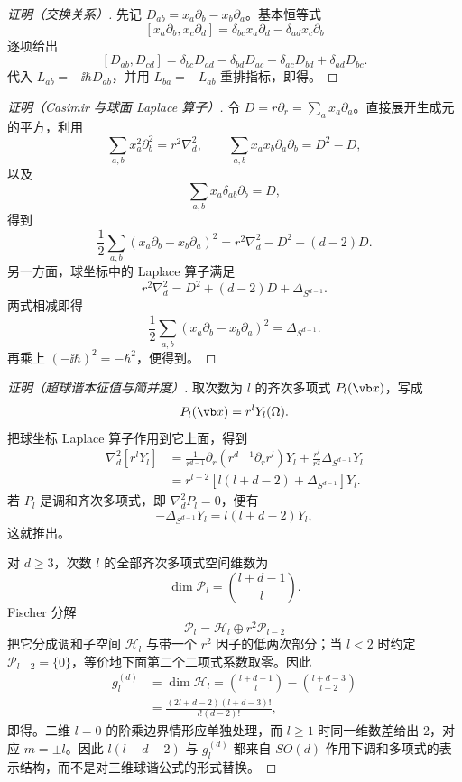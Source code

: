 \begin{proof}[证明（交换关系）]
先记 $D_{ab}=x_a\partial_b-x_b\partial_a$。基本恒等式
\[
[x_a\partial_b,x_c\partial_d]
=\delta_{bc}x_a\partial_d-\delta_{ad}x_c\partial_b
\]
逐项给出
\[
[D_{ab},D_{cd}]
=\delta_{bc}D_{ad}-\delta_{bd}D_{ac}
-\delta_{ac}D_{bd}+\delta_{ad}D_{bc}.
\]
代入 $L_{ab}=-\ii\hbar D_{ab}$，并用 $L_{ba}=-L_{ab}$ 重排指标，即得。
\end{proof}

\begin{proof}[证明（Casimir 与球面 Laplace 算子）]
令 $D=r\partial_r=\sum_ax_a\partial_a$。直接展开生成元的平方，利用
\[
\sum_{a,b}x_a^2\partial_b^2=r^2\nabla_d^2,
\qquad
\sum_{a,b}x_ax_b\partial_a\partial_b=D^2-D,
\]
以及
\[
\sum_{a,b}x_a\delta_{ab}\partial_b=D,
\]
得到
\[
\frac12\sum_{a,b}(x_a\partial_b-x_b\partial_a)^2
=r^2\nabla_d^2-D^2-(d-2)D.
\]
另一方面，球坐标中的 Laplace 算子满足
\[
r^2\nabla_d^2=D^2+(d-2)D+\Delta_{S^{d-1}}.
\]
两式相减即得
\[
\frac12\sum_{a,b}(x_a\partial_b-x_b\partial_a)^2
=\Delta_{S^{d-1}}.
\]
再乘上 $(-\ii\hbar)^2=-\hbar^2$，便得到。
\end{proof}

\begin{proof}[证明（超球谐本征值与简并度）]
取次数为 $l$ 的齐次多项式 $P_l(\vb x)$，写成
\[
P_l(\vb x)=r^lY_l(\Omega).
\]
把球坐标 Laplace 算子作用到它上面，得到
\[
\begin{aligned}
\nabla_d^2[r^lY_l]
&=\frac1{r^{d-1}}\partial_r
\left(r^{d-1}\partial_r r^l\right)Y_l
+\frac{r^l}{r^2}\Delta_{S^{d-1}}Y_l\\
&=r^{l-2}
\left[l(l+d-2)+\Delta_{S^{d-1}}\right]Y_l.
\end{aligned}
\]
若 $P_l$ 是调和齐次多项式，即 $\nabla_d^2P_l=0$，便有
\[
-\Delta_{S^{d-1}}Y_l=l(l+d-2)Y_l,
\]
这就推出。

对 $d\ge3$，次数 $l$ 的全部齐次多项式空间维数为
\[
\dim\mathcal P_l=\binom{l+d-1}{l}.
\]
Fischer 分解
\[
\mathcal P_l=\mathcal H_l\oplus r^2\mathcal P_{l-2}
\]
把它分成调和子空间 $\mathcal H_l$ 与带一个 $r^2$ 因子的低两次部分；当 $l<2$ 时约定 $\mathcal P_{l-2}=\{0\}$，等价地下面第二个二项式系数取零。因此
\[
\begin{aligned}
g_l^{(d)}
&=\dim\mathcal H_l
=\binom{l+d-1}{l}-\binom{l+d-3}{l-2}\\
&=\frac{(2l+d-2)(l+d-3)!}{l!(d-2)!},
\end{aligned}
\]
即得。二维 $l=0$ 的阶乘边界情形应单独处理，而 $l\ge1$ 时同一维数差给出 $2$，对应 $m=\pm l$。因此 $l(l+d-2)$ 与 $g_l^{(d)}$ 都来自 $SO(d)$ 作用下调和多项式的表示结构，而不是对三维球谐公式的形式替换。
\end{proof}


